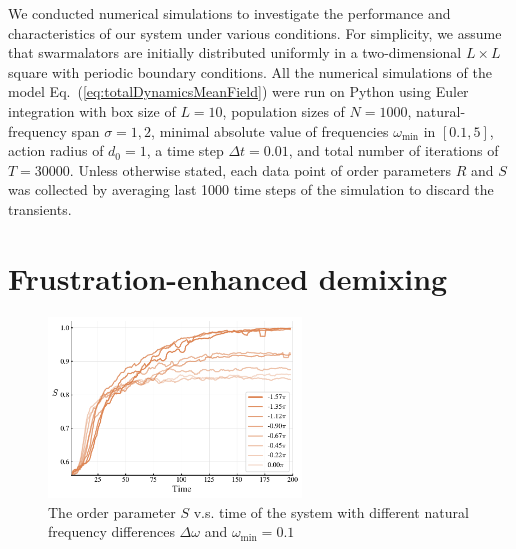 \documentclass{article}
\begin{document}
We conducted numerical simulations to investigate the performance and characteristics of our system under various conditions.
For simplicity, we assume that swarmalators are initially distributed uniformly in a two-dimensional $L\times L$ square with periodic boundary conditions.
All the numerical simulations of the model Eq.~(\ref{eq:totalDynamicsMeanField}) were run on Python using Euler integration with box size of $L=10$, population sizes of $N=1000$, natural-frequency span $\sigma=1, 2$, minimal absolute value of frequencies $\omega_{\min}$ in $\left[ 0.1, 5 \right]$, action radius of $d_0=1$, a time step $\Delta t=0.01$, and total number of iterations of $T=30000$. 
Unless otherwise stated, each data point of order parameters $R$ and $S$ was collected by averaging last 1000 time steps of the simulation to discard the transients.

\newpage
\section{\label{sec:behaviors}Frustration-enhanced demixing}

\begin{figure}[H]
    \centering
    \includegraphics[width=0.6\textwidth]{figs/S_l0.15_d0.5_dO2_S.pdf}
    \caption{The order parameter $S$ v.s. time of the system with different natural frequency differences $\Delta \omega$ and $\omega_{\min}=0.1$}
\end{figure}
\end{document}
